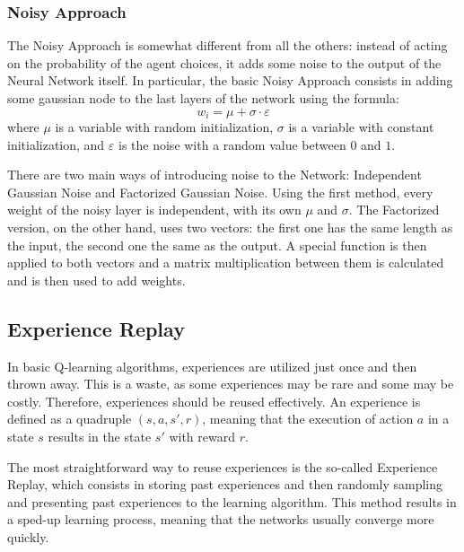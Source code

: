 \documentclass[a4paper, 12pt]{article}
\numberwithin{equation}{section}
\begin{document}
\subsubsection[Noisy Approach]{Noisy Approach \cite{deep-reinforcement, noisy}}

The Noisy Approach is somewhat different from all the others: instead of acting on the probability of the agent choices, it adds some noise to the output of the Neural Network itself. In particular, the basic Noisy Approach consists in adding some gaussian node to the last layers of the network using the formula:
\begin{equation}
	w_i = \mu+\sigma\cdot\varepsilon
\end{equation}
where $\mu$ is a variable with random initialization, $\sigma$ is a variable with constant initialization, and $\varepsilon$ is the noise with a random value between $0$ and $1$.

There are two main ways of introducing noise to the Network: Independent Gaussian Noise and Factorized Gaussian Noise. Using the first method, every weight of the noisy layer is independent, with its own $\mu$ and $\sigma$. The Factorized version, on the other hand, uses two vectors: the first one has the same length as the input, the second one the same as the output. A special function is then applied to both vectors and a matrix multiplication between them is calculated and is then used to add weights.



\subsection[Experience Replay]{Experience Replay \cite{experience-replay}}\label{sec:experience-replay}

In basic Q-learning algorithms, experiences are utilized just once and then thrown away. This is a waste, as some experiences may be rare and some may be costly. Therefore, experiences should be reused effectively. An experience is defined as a quadruple $\left(s,a,s',r\right)$, meaning that the execution of action $a$ in a state $s$ results in the state $s'$ with reward $r$.

The most straightforward way to reuse experiences is the so-called Experience Replay, which consists in storing past experiences and then randomly sampling and presenting past experiences to the learning algorithm. This method results in a sped-up learning process, meaning that the networks usually converge more quickly.
\end{document}
